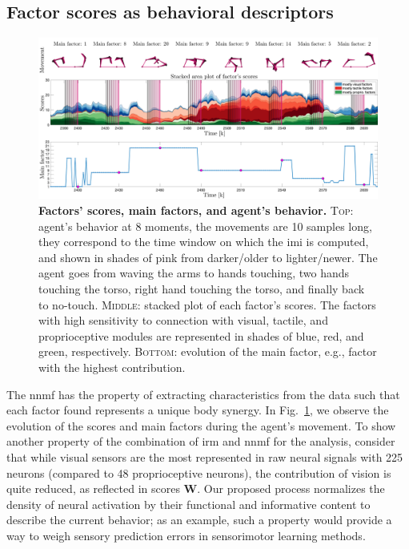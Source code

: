 \documentclass[letterpaper, 10 pt, conference]{ieeeconf}  %
\begin{document}
\subsection{Factor scores as behavioral descriptors}
\begin{figure}[h!]
    \centering
    \includegraphics[width=.99\textwidth]{fig/factors_example_time_v2.png}
    \caption{\textbf{Factors' scores, main factors, and agent's behavior.} \textsc{Top}: agent's behavior at 8 moments, the movements are 10 samples long, they correspond to the time window on which the \acl{imi} is computed, and shown in shades of pink from darker/older to lighter/newer. The agent goes from waving the arms to hands touching, two hands touching the torso, right hand touching the torso, and finally back to no-touch. \textsc{Middle}: stacked plot of each factor's scores. The factors with high sensitivity to connection with visual, tactile, and proprioceptive modules are represented in shades of blue, red, and green, respectively. \textsc{Bottom}: evolution of the main factor, e.g., factor with the highest contribution.}
    \label{fig:factors_time}
\end{figure}
The \acl{nnmf} has the property of extracting characteristics from the data such that each factor found represents a unique body synergy. In Fig.~\ref{fig:factors_time}, we observe the evolution of the scores and main factors during the agent's movement. To show another property of the combination of \ac{irm} and \ac{nnmf} for the analysis, consider that while visual sensors are the most represented in raw neural signals with 225 neurons (compared to 48 proprioceptive neurons), the contribution of vision is quite reduced, as reflected in scores $\bm{W}$. Our proposed process normalizes the density of neural activation by their functional and informative content to describe the current behavior; as an example, such a property would provide a way to weigh sensory prediction errors in sensorimotor learning methods.
\end{document}
